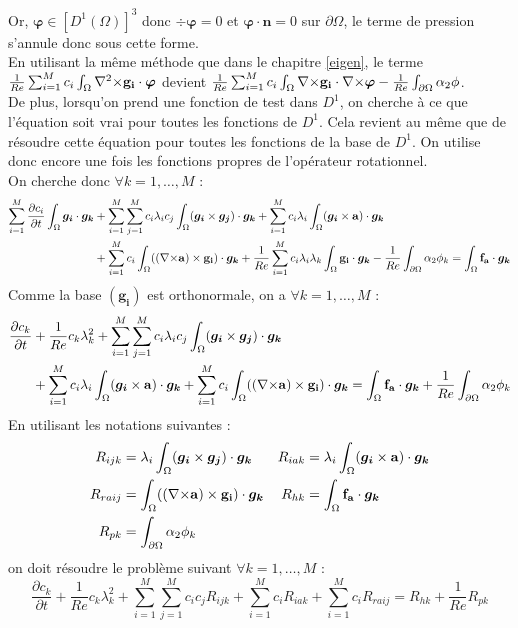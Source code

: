 Or, $\bm{\varphi}\in [D^1(\Omega)]^3$ donc $\div\bm{\varphi}=0$ et $\bm{\varphi}\cdot \mathbf{n}=0$ sur $\partial\Omega$, le terme de pression s'annule donc sous cette forme.\\
En utilisant la même méthode que dans le chapitre \ref{eigen}, le terme $\frac{1}{Re}\sum_{i=1}^Mc_i\int_\Omega{\nabla^2\times}\mathbf{g_i}\cdot\bm{\varphi}$ devient $\frac{1}{Re}\sum_{i=1}^Mc_i\int_\Omega{\nabla\times}\mathbf{g_i}\cdot{\nabla\times}\bm{\varphi} -\frac{1}{Re}\int_{\partial\Omega} \alpha_2\phi$.\\
De plus, lorsqu'on prend une fonction de test dans $D^1$, on cherche à ce que l'équation soit vrai pour toutes les fonctions de $D^1$. Cela revient au même que de résoudre cette équation pour toutes les fonctions de la base de $D^1$. On utilise donc encore une fois les fonctions propres de l'opérateur rotationnel.\\
On cherche donc $\forall k=1,\dots,M$ :
\begin{align*}
\sum_{i=1}^M\frac{\partial c_i}{\partial t}\int_\Omega\bm{g_i}\cdot\bm{g_k} &+ \sum_{i=1}^M\sum_{j=1}^Mc_i\lambda_ic_j\int_\Omega(\bm{g_i}\times \bm{g_j})\cdot\bm{g_k} + \sum_{i=1}^Mc_i\lambda_i\int_\Omega(\bm{g_i}\times \mathbf{a})\cdot\bm{g_k}\\
& +  \sum_{i=1}^Mc_i\int_\Omega(({\nabla\times}\mathbf{a})\times \mathbf{g_i})\cdot\bm{g_k} +\frac{1}{Re}\sum_{i=1}^Mc_i\lambda_i\lambda_k\int_\Omega\mathbf{g_i}\cdot\bm{g_k}-\frac{1}{Re}\int_{\partial\Omega} \alpha_2\phi_k = \int_\Omega\mathbf{f_a}\cdot\bm{g_k}\\
\end{align*}
Comme la base $(\bm{g_i})$ est orthonormale, on a $\forall k=1,\dots,M$ :
\begin{align*}
\frac{\partial c_k}{\partial t} &+ \frac{1}{Re}c_k\lambda_k^2 + \sum_{i=1}^M\sum_{j=1}^Mc_i\lambda_ic_j\int_\Omega(\bm{g_i}\times \bm{g_j})\cdot\bm{g_k}\\
& + \sum_{i=1}^Mc_i\lambda_i\int_\Omega(\bm{g_i}\times \mathbf{a})\cdot\bm{g_k} +  \sum_{i=1}^Mc_i\int_\Omega(({\nabla\times}\mathbf{a})\times \mathbf{g_i})\cdot\bm{g_k} = \int_\Omega\mathbf{f_a}\cdot\bm{g_k}+\frac{1}{Re}\int_{\partial\Omega} \alpha_2\phi_k\\
\end{align*}
En utilisant les notations suivantes :
\begin{align*}
R_{ijk} &= \lambda_i\int_\Omega(\bm{g_i}\times \bm{g_j})\cdot\bm{g_k} & R_{iak} &= \lambda_i\int_\Omega(\bm{g_i}\times \mathbf{a})\cdot\bm{g_k}\\
R_{raij} &= \int_\Omega(({\nabla\times}\mathbf{a})\times \mathbf{g_i})\cdot\bm{g_k} & R_{hk} &= \int_\Omega\mathbf{f_a}\cdot\bm{g_k}\\
R_{pk} &= \int_{\partial\Omega} \alpha_2\phi_k
\end{align*}
on doit résoudre le problème suivant $\forall k=1,\dots,M$ :
\begin{equation}\label{fvc}
\frac{\partial c_k}{\partial t} + \frac{1}{Re}c_k\lambda_k^2 + \sum_{i=1}^M\sum_{j=1}^Mc_ic_jR_{ijk} + \sum_{i=1}^Mc_iR_{iak} + \sum_{i=1}^Mc_iR_{raij} = R_{hk} + \frac{1}{Re}R_{pk}
\end{equation}

